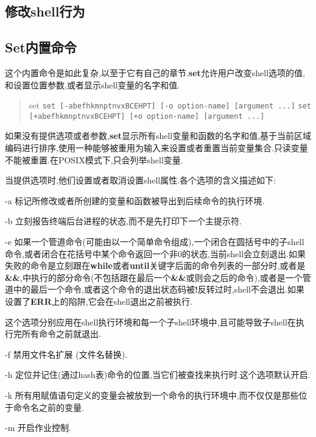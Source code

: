 \documentclass[draft,openany]{book}
\begin{document}
\begin{CJK}{UTF8}{gbsn}
    \section{修改shell行为}

    \subsection{Set内置命令}
    这个内置命令是如此复杂,以至于它有自己的章节.\textbf{set}允许用户改变shell选项的值,和设置位置参数,或者显示shell变量的名字和值.
    \begin{quote}
        set
        \verb|set [-abefhkmnptnvxBCEHPT] [-o option-name] [argument ...]|
        \verb|set [+abefhkmnptnvxBCEHPT] [+o option-name] [argument ...]|
    \end{quote}
    如果没有提供选项或者参数,\textbf{set}显示所有shell变量和函数的名字和值,基于当前区域编码进行排序,使用一种能够被重用为输入来设置或者重置当前变量集合.只读变量不能被重置.在POSIX模式下,只会列举shell变量.\par
    当提供选项时,他们设置或者取消设置shell属性.各个选项的含义描述如下:
    \begin{basedescript}{\desclabelstyle{\nextlinelabel}\desclabelwidth{2.5em}}
    \item[-a] 标记所修改或者所创建的变量和函数被导出到后续命令的执行环境.
    \item[-b] 立刻报告终端后台进程的状态,而不是先打印下一个主提示符.
    \item[-e] 如果一个管道命令(可能由以一个简单命令组成),一个闭合在圆括号中的子shell命令,或者闭合在花括号中某个命令返回一个非0的状态,当前shell会立刻退出.如果失败的命令是立刻跟在\textbf{while}或者\textbf{until}关键字后面的命令列表的一部分时,或者是\textbf{\&\&},\textbf{\textbar\textbar}中执行的部分命令(不包括跟在最后一个\textbf{\&\&}或则会\textbf{\textbar\textbar}之后的命令),或者是一个管道中的最后一个命令,或者这个命令的退出状态码被\textbf{!}反转过时,shell不会退出.如果设置了\textbf{ERR}上的陷阱,它会在shell退出之前被执行.\par
        这个选项分别应用在shell执行环境和每一个子shell环境中,且可能导致子shell在执行完所有命令之前就退出.
    \item[-f] 禁用文件名扩展 (文件名替换).
    \item[-h] 定位并记住(通过hash表)命令的位置,当它们被查找来执行时.这个选项默认开启.
    \item[-k] 所有用赋值语句定义的变量会被放到一个命令的执行环境中,而不仅仅是那些位于命令名之前的变量.
    \item[-m] 开启作业控制.

\end{basedescript}
\end{CJK}
\end{document}
